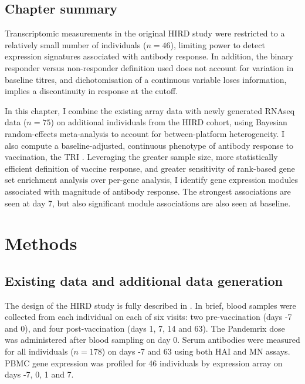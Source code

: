 \subsection{Chapter summary}

Transcriptomic measurements in the original \gls{HIRD} study were restricted to a relatively small number of individuals ($n=46$), limiting power to detect expression signatures associated with antibody response.
In addition, the binary responder versus non-responder definition used does not account for variation in baseline titres, 
and dichotomisation of a continuous variable loses information,
implies a discontinuity in response at the cutoff.

In this chapter, I combine the existing array data with newly generated \gls{RNAseq} data ($n=75$) on additional individuals from the \gls{HIRD} cohort, 
using Bayesian random-effects meta-analysis to account for between-platform heterogeneity.
I also compute a baseline-adjusted, continuous phenotype of antibody response to vaccination, the \gls{TRI} \autocite{bucasas2011EarlyPatternsGene}.
Leveraging the greater sample size,
more statistically efficient definition of vaccine response,
and greater sensitivity of rank-based gene set enrichment analysis over per-gene analysis,
I identify gene expression modules associated with magnitude of antibody response.
The strongest associations are seen at day 7, but also significant module associations are also seen at baseline.

\section{Methods}

\subsection{Existing  data and additional data generation}
\label{subsec:hird_dge_studyDesign}

The design of the \gls{HIRD} study is fully described in \textcite{sobolev2016AdjuvantedInfluenzaH1N1Vaccination}.
In brief, blood samples were collected from each individual on each of six visits:
two pre-vaccination (days -7 and 0), and four post-vaccination (days 1, 7, 14 and 63).
The Pandemrix dose was administered after blood sampling on day 0.
Serum antibodies were measured for all individuals ($n=178$) on days -7 and 63 using both \gls{HAI} and \gls{MN} assays. 
\gls{PBMC} gene expression was profiled for 46 individuals by expression array on days -7, 0, 1 and 7.


